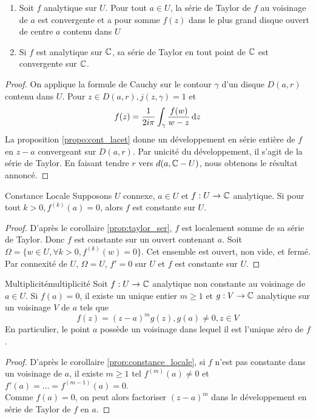 \documentclass{cours}
\begin{document}
\begin{corollaire}{}{}\label{taylor_ser}
    \begin{enumerate}
        \item Soit $f$ analytique sur $U$. Pour tout $a \in U$, la série de Taylor de $f$ au voisinage de $a$ est convergente et a pour somme $f(z)$ dans le plus grand disque ouvert de centre $a$ contenu dans $U$
        \item Si $f$ est analytique sur $\mathbb{C}$, sa série de Taylor en tout point de $\mathbb{C}$ est convergente sur $\mathbb{C}$. 
    \end{enumerate}
\end{corollaire}
\begin{proof}
    On applique la formule de Cauchy sur le contour $\gamma$ d'un disque $D(a, r)$ contenu dans $U$. Pour $z \in D(a, r), j(z, \gamma) = 1$ et 
    \[
        f(z) = \frac{1}{2i\pi}\int_{\gamma}^{}\frac{f(w)}{w -z}{\rm \, d} z
    \]
    La proposition \ref{propo:cont_lacet} donne un développement en série entière de $f$ en $z - a$ convergeant sur $D(a, r)$. Par unicité du développement, il s'agit de la série de Taylor. En faisant tendre $r$ vers $d(a, \mathbb{C} - U)$, nous obtenons le résultat annoncé. 
\end{proof}

\begin{corollaire}{Constance Locale}{}\label{prop:constance_locale}
    Supposons $U$ connexe, $a \in U$ et $f : U \to \mathbb{C}$ analytique. Si pour tout $k > 0, f^{(k)}(a) = 0$, alors $f$ est constante sur $U$. 
\end{corollaire}
\begin{proof}
    D'après le corollaire \ref{prop:taylor_ser}, $f$ est localement somme de sa série de Taylor. Donc $f$ est constante sur un ouvert contenant $a$. Soit $\Omega = \{w \in U, \forall k > 0, f^{(k)}(w) = 0\}$. Cet ensemble est ouvert, non vide, et fermé. Par connexité de $U$, $\Omega = U$, $f' = 0$ sur $U$ et $f$ est constante sur $U$.
\end{proof}

\begin{théorème}{Multiplicité}{multiplicité}
    Soit $f : U \to \mathbb{C}$ analytique non constante au voisinage de $a \in U$. Si $f(a) = 0$, il existe un unique entier $m \geq 1$ et $g : V \to \mathbb{C}$ analytique sur un voisinage $V$ de $a$ tels que 
    \[
        f(z) = \left(z - a\right)^{m}g(z), g(a) \neq 0, z\in V
    \]
    En particulier, le point $a$ possède un voisinage dans lequel il est l'unique zéro de $f$.
\end{théorème}
\begin{proof}
    D'après le corollaire \ref{prop:constance_locale}, si $f$ n'est pas constante dans un voisinage de $a$, il existe $m \geq 1$ tel $f^{(m)}(a) \neq 0$ et $f'(a) = \ldots = f^{(m-1)}(a) = 0$.\\
    Comme $f(a) = 0$, on peut alors factoriser $(z -a)^{m}$ dans le développement en série de Taylor de $f$ en $a$.
\end{proof}
\end{document}
